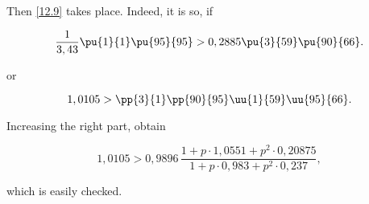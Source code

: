 Then \ref{12.9} takes place. Indeed, it is so, if

\begin{equation*}
	\dfrac{1}{3,43} \pu{1}{1} \pu{95}{95}
	>
	0,2885 \pu{3}{59} \pu{90}{66}.
\end{equation*}

or

\begin{equation*}
	1,0105
	>
	\pp{3}{1} \pp{90}{95} \uu{1}{59} \uu{95}{66}.
\end{equation*}

Increasing the right part, obtain

\begin{equation*}
	1,0105
	>
	0,9896 \,
	\dfrac
	{1 + p \cdot 1,0551 + p^2 \cdot 0,20875}
	{1 + p \cdot 0,983 + p^2 \cdot 0,237},
\end{equation*}

which is easily checked.

